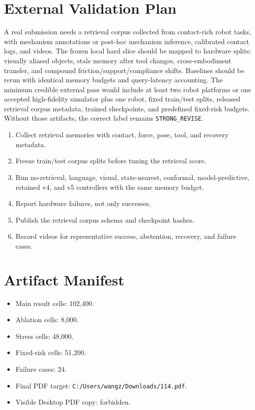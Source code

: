 \documentclass{article}
\begin{document}
\section{External Validation Plan}
A real submission needs a retrieval corpus collected from contact-rich robot tasks, with mechanism annotations or post-hoc mechanism inference, calibrated contact logs, and videos. The frozen local hard slice should be mapped to hardware splits: visually aliased objects, stale memory after tool changes, cross-embodiment transfer, and compound friction/support/compliance shifts. Baselines should be rerun with identical memory budgets and query-latency accounting.
The minimum credible external pass would include at least two robot platforms or one accepted high-fidelity simulator plus one robot, fixed train/test splits, released retrieval corpus metadata, trained checkpoints, and predefined fixed-risk budgets. Without those artifacts, the correct label remains \texttt{STRONG\_REVISE}.
\begin{enumerate}
\item Collect retrieval memories with contact, force, pose, tool, and recovery metadata.
\item Freeze train/test corpus splits before tuning the retrieval score.
\item Run no-retrieval, language, visual, state-nearest, conformal, model-predictive, retained v4, and v5 controllers with the same memory budget.
\item Report hardware failures, not only successes.
\item Publish the retrieval corpus schema and checkpoint hashes.
\item Record videos for representative success, abstention, recovery, and failure cases.
\end{enumerate}
\clearpage
\section{Artifact Manifest}
\begin{itemize}
\item Main result cells: 102,400.
\item Ablation cells: 8,000.
\item Stress cells: 48,000.
\item Fixed-risk cells: 51,200.
\item Failure cases: 24.
\item Final PDF target: \texttt{C:/Users/wangz/Downloads/114.pdf}.
\item Visible Desktop PDF copy: forbidden.
\end{itemize}
\end{document}
